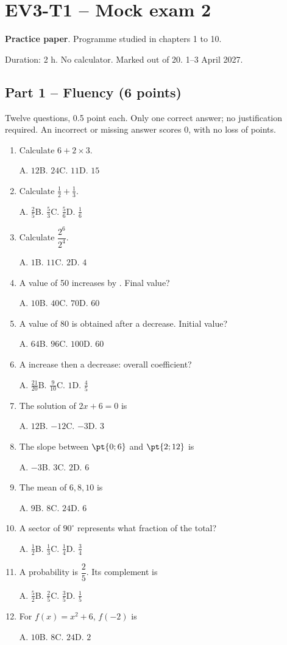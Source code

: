 \mxnewpage\section*{EV3-T1 -- Mock exam 2}\label{EV3-T1}
\textbf{Practice paper}. Programme studied in chapters 1 to 10.\par Duration: 2 h. No calculator. Marked out of 20. 1--3 April 2027.
\subsection*{Part 1 -- Fluency (6 points)}
Twelve questions, \num{0,5} point each. Only one correct answer; no justification required. An incorrect or missing answer scores 0, with no loss of points.
\begin{enumerate}
\item Calculate $6+2\times3$.\par A. $12$\quad B. $24$\quad C. $11$\quad D. $15$
\item Calculate $\frac12+\frac13$.\par A. $\frac{2}{5}$\quad B. $\frac{5}{3}$\quad C. $\frac{5}{6}$\quad D. $\frac{1}{6}$
\item Calculate $\dfrac{2^6}{2^{4}}$.\par A. $1$\quad B. $11$\quad C. $2$\quad D. $4$
\item A value of 50 increases by . Final value?\par A. $10$\quad B. $40$\quad C. $70$\quad D. $60$
\item A value of 80 is obtained after a  decrease. Initial value?\par A. $64$\quad B. $96$\quad C. $100$\quad D. $60$
\item A  increase then a  decrease: overall coefficient?\par A. $\frac{21}{20}$\quad B. $\frac{9}{10}$\quad C. $1$\quad D. $\frac{4}{5}$
\item The solution of $2x+6=0$ is\par A. $12$\quad B. $-12$\quad C. $-3$\quad D. $3$
\item The slope between $\pt{0;6}$ and $\pt{2;12}$ is\par A. $-3$\quad B. $3$\quad C. $2$\quad D. $6$
\item The mean of $6, 8, 10$ is\par A. $9$\quad B. $8$\quad C. $24$\quad D. $6$
\item A sector of $90^\circ$ represents what fraction of the total?\par A. $\frac{1}{2}$\quad B. $\frac{1}{3}$\quad C. $\frac{1}{4}$\quad D. $\frac{3}{4}$
\item A probability is $\dfrac{2}{5}$. Its complement is\par A. $\frac{5}{2}$\quad B. $\frac{2}{5}$\quad C. $\frac{3}{5}$\quad D. $\frac{1}{5}$
\item For $f(x)=x^2+6$, $f(-2)$ is\par A. $10$\quad B. $8$\quad C. $24$\quad D. $2$
\end{enumerate}
